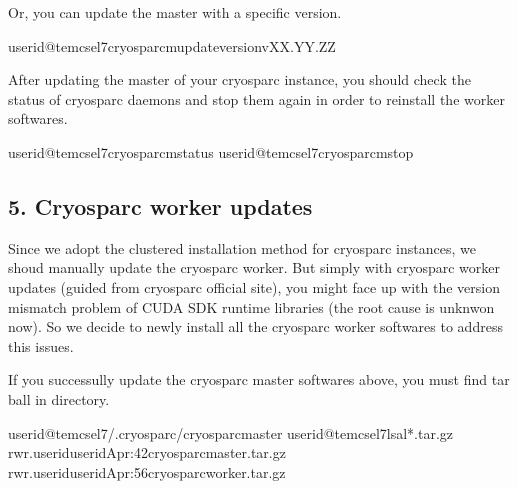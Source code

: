 \documentclass[a4paper,11pt,english]{sphinxmanual}
\begin{document}
\sphinxAtStartPar
Or, you can update the master with a specific version.

\begin{sphinxVerbatim}[commandchars=\\\{\}]
userid@tem\PYGZhy{}cs\PYGZhy{}el7\PYGZdl{}\PYGZgt{}cryosparcmupdate\PYGZhy{}\PYGZhy{}versionvXX.YY.ZZ
\end{sphinxVerbatim}

\sphinxAtStartPar
After updating the master of your cryosparc instance, you should check the status of cryosparc daemons and stop them again in order to re\sphinxhyphen{}install the worker softwares.

\begin{sphinxVerbatim}[commandchars=\\\{\}]
userid@tem\PYGZhy{}cs\PYGZhy{}el7\PYGZdl{}\PYGZgt{}cryosparcmstatus
userid@tem\PYGZhy{}cs\PYGZhy{}el7\PYGZdl{}\PYGZgt{}cryosparcmstop
\end{sphinxVerbatim}


\subsection{5. Cryosparc worker updates}
\label{\detokenize{faq:cryosparc-worker-updates}}
\sphinxAtStartPar
Since we adopt the clustered installation method for cryosparc instances, we shoud manually update the cryosparc worker.
But simply with cryosparc worker updates (guided from cryosparc official site), you might face up with the version mismatch problem of CUDA SDK runtime libraries (the root cause is unknwon now).
So we decide to newly install all the cryosparc worker softwares to address this issues.

\sphinxAtStartPar
If you successully update the cryosparc master softwares above,
you must find  tar ball in  directory.

\begin{sphinxVerbatim}[commandchars=\\\{\}]
userid@tem\PYGZhy{}cs\PYGZhy{}el7\PYGZdl{}\PYGZgt{}\PYGZti{}/.cryosparc/cryosparc\PYGZus{}master
userid@tem\PYGZhy{}cs\PYGZhy{}el7\PYGZdl{}\PYGZgt{}ls\PYGZhy{}al*.tar.gz
\PYGZhy{}rw\PYGZhy{}r\PYGZhy{}\PYGZhy{}\PYGZhy{}\PYGZhy{}\PYGZhy{}.useriduseridApr:42cryosparc\PYGZus{}master.tar.gz
\PYGZhy{}rw\PYGZhy{}r\PYGZhy{}\PYGZhy{}\PYGZhy{}\PYGZhy{}\PYGZhy{}.useriduseridApr:56cryosparc\PYGZus{}worker.tar.gz
\end{sphinxVerbatim}
\end{document}
